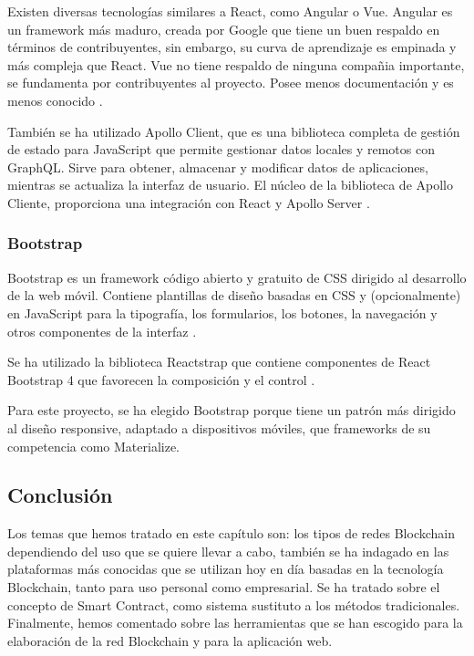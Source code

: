 \vspace{5mm}

\noindent Existen diversas tecnologías similares a React, como Angular o Vue. Angular es un framework más maduro, 
creada por Google que tiene un buen respaldo en términos de contribuyentes, sin embargo, su curva de aprendizaje es 
empinada y más compleja que React. Vue no tiene respaldo de ninguna compañia importante, se fundamenta por 
contribuyentes al proyecto. Posee menos documentación y es menos conocido \cite{angular-react-vue}. 

\vspace{5mm}

\noindent También se ha utilizado Apollo Client, que es una biblioteca completa de gestión de estado para JavaScript 
que permite gestionar datos locales y remotos con GraphQL. Sirve para obtener, almacenar y modificar datos de 
aplicaciones, mientras se actualiza la interfaz de usuario. El núcleo de la biblioteca de Apollo Cliente, proporciona 
una integración con React y Apollo Server \cite{introduction-apollo-client}.

\subsubsection*{Bootstrap}

Bootstrap es un framework código abierto y gratuito de CSS dirigido al desarrollo de la web móvil. Contiene 
plantillas de diseño basadas en CSS y (opcionalmente) en JavaScript para la tipografía, los formularios, los botones, 
la navegación y otros componentes de la interfaz \cite{bootstrap}.

\vspace{5mm}

\noindent Se ha utilizado la biblioteca Reactstrap que contiene componentes de React Bootstrap 4 que favorecen la 
composición y el control \cite{reactstrap}.

\vspace{5mm}

\noindent Para este proyecto, se ha elegido Bootstrap porque tiene un patrón más dirigido al diseño responsive, 
adaptado a dispositivos móviles, que frameworks de su competencia como Materialize.

\subsection{Conclusión}

Los temas que hemos tratado en este capítulo son: los tipos de redes Blockchain dependiendo del uso que se quiere 
llevar a cabo, también se ha indagado en las plataformas más conocidas que se utilizan hoy en día basadas en la 
tecnología Blockchain, tanto para uso personal como empresarial. Se ha tratado sobre el concepto de Smart Contract, 
como sistema sustituto a los métodos tradicionales. Finalmente, hemos comentado sobre las herramientas que se han 
escogido para la elaboración de la red Blockchain y para la aplicación web.

\newpage